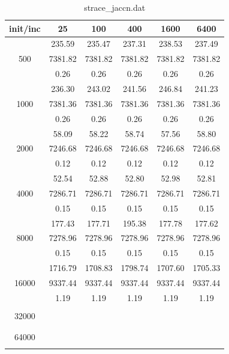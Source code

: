 {\begin{table}[th]
\caption{strace\_jaccn.dat}
\label{tab:strace_jaccn.dat}
\centering
\begin{tabular}{|c||c|c|c|c|c|}
\hline
init/inc & 25 & 100 & 400 & 1600 & 6400 \\ \hline \hline
  & 235.59 & 235.47 & 237.31 & 238.53 & 237.49\\ 
500  & 7381.82 & 7381.82 & 7381.82 & 7381.82 & 7381.82\\ 
  & 0.26 & 0.26 & 0.26 & 0.26 & 0.26\\ \hline 
  & 236.30 & 243.02 & 241.56 & 246.84 & 241.23\\ 
1000  & 7381.36 & 7381.36 & 7381.36 & 7381.36 & 7381.36\\ 
  & 0.26 & 0.26 & 0.26 & 0.26 & 0.26\\ \hline 
  & 58.09 & 58.22 & 58.74 & 57.56 & 58.80\\ 
2000  & 7246.68 & 7246.68 & 7246.68 & 7246.68 & 7246.68\\ 
  & 0.12 & 0.12 & 0.12 & 0.12 & 0.12\\ \hline 
  & 52.54 & 52.88 & 52.80 & 52.98 & 52.81\\ 
4000  & 7286.71 & 7286.71 & 7286.71 & 7286.71 & 7286.71\\ 
  & 0.15 & 0.15 & 0.15 & 0.15 & 0.15\\ \hline 
  & 177.43 & 177.71 & 195.38 & 177.78 & 177.62\\ 
8000  & 7278.96 & 7278.96 & 7278.96 & 7278.96 & 7278.96\\ 
  & 0.15 & 0.15 & 0.15 & 0.15 & 0.15\\ \hline 
  & 1716.79 & 1708.83 & 1798.74 & 1707.60 & 1705.33\\ 
16000  & 9337.44 & 9337.44 & 9337.44 & 9337.44 & 9337.44\\ 
  & 1.19 & 1.19 & 1.19 & 1.19 & 1.19\\ \hline 
  &  &  &  &  & \\ 
32000  &  &  &  &  & \\ 
  &  &  &  &  & \\ \hline 
  &  &  &  &  & \\ 
64000  &  &  &  &  & \\ 
  &  &  &  &  & \\ \hline 
\end{tabular}
\end{table}

}
